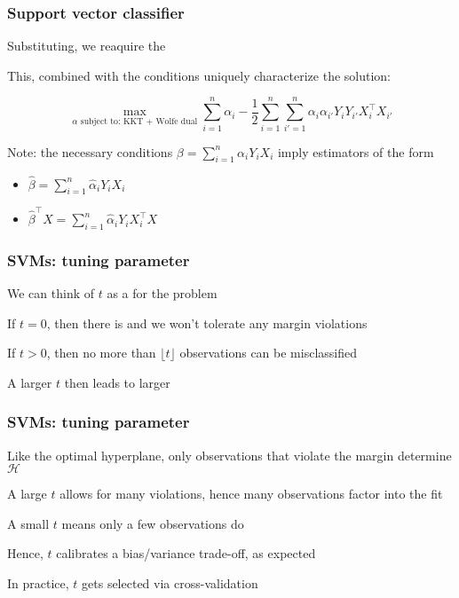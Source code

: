 \documentclass[12pt]{beamer}
\begin{document}
\begin{frame}
\frametitle{Support vector classifier}
Substituting, we reaquire the 
\vsp

This, combined with the  conditions uniquely characterize the solution:


\[
\max_{\alpha \textrm{ subject to: KKT + Wolfe dual}} \sum_{i=1}^n \alpha_i - 
\frac{1}{2} \sum_{i=1}^n\sum_{i'=1}^n \alpha_i \alpha_{i'} Y_i Y_{i'} X_{i}^{\top} X_{i'}
\]


\vsp
Note: the necessary conditions $\beta = \sum_{i=1}^n \alpha_iY_iX_i$
imply estimators of the form
\begin{itemize}
\item  $\hat\beta = \sum_{i=1}^n \hat{\alpha}_iY_iX_i$
\item  $\hat\beta^{\top}X = \sum_{i=1}^n \hat{\alpha}_iY_iX_i^{\top}X$
\end{itemize}


\end{frame}


\begin{frame}
\frametitle{SVMs: tuning parameter}
We can think of $t$ as a  for the problem

\vsp
If $t = 0$, then there is  and we won't tolerate any margin violations

\vsp
If $t > 0$, then no more than $\lfloor t \rfloor$ observations can be misclassified

\vsp
A larger $t$ then leads to larger 

\end{frame}

\begin{frame}
\frametitle{SVMs: tuning parameter}
\vsp

Like the optimal hyperplane, only observations that violate the margin
determine $\mathcal{H}$

\vsp
A large $t$ allows for many violations, hence many observations factor into the fit

\vsp
A small $t$ means only a few observations do

\vsp
Hence, $t$ calibrates a bias/variance trade-off, as expected

\vsp
In practice, $t$ gets selected via cross-validation
\end{frame}
\end{document}
